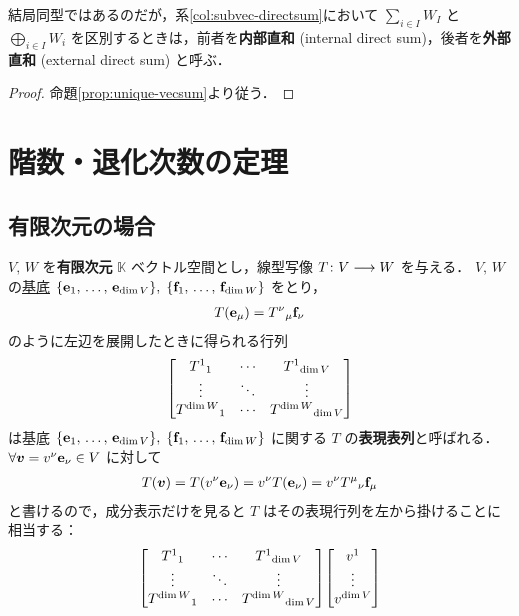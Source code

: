 \documentclass[rep_main]{subfiles}
\begin{document}
\begin{marker}
    結局同型ではあるのだが，系\ref{col:subvec-directsum}において $\sum_{i \in I} W_I$ と $\bigoplus_{i \in I} W_i$ を区別するときは，前者を\textbf{内部直和} (internal direct sum)，後者を\textbf{外部直和} (external direct sum) と呼ぶ．
\end{marker}

\begin{proof}
    命題\ref{prop:unique-vecsum}より従う．
\end{proof}

\section{階数・退化次数の定理}

\subsection{有限次元の場合}

$V,\, W$ を\textbf{有限次元} $\mathbb{K}$ ベクトル空間とし，線型写像 $T \colon V \longrightarrow W$ を与える．
$V,\, W$ の\hyperref[def:free-mod]{基底} $\{\vb{e}_1,\, \dots,\, \vb{e}_{\dim V}\},\; \{\vb{f}_1,\, \dots,\, \vb{f}_{\dim W}\}$ をとり，
\begin{align}
	T(\vb{e}_\mu) = T^\nu{}_{\mu} \vb{f}_\nu
\end{align}
のように左辺を展開したときに得られる行列
\begin{align}
	\mqty[T^1{}_1 & \cdots &T^1{}_{\dim V} \\ \vdots &\ddots &\vdots \\ T^{\dim W}{}_1 &\cdots &T^{\dim W}{}_{\dim V}]
\end{align}
は基底 $\{\vb{e}_1,\, \dots,\, \vb{e}_{\dim V}\},\; \{\vb{f}_1,\, \dots,\, \vb{f}_{\dim W}\}$ に関する $T$ の\textbf{表現表列}と呼ばれる．
$\forall \bm{v} = v^\nu \vb{e}_\nu \in V$ に対して
\begin{align}
	T(\bm{v}) = T(v^\nu \vb{e}_\nu) = v^\nu T(\vb{e}_\nu) = v^\nu T^\mu{}_{\nu} \vb{f}_\mu
\end{align}
と書けるので，成分表示だけを見ると $T$ はその表現行列を左から掛けることに相当する：
\begin{align}
	\mqty[T^1{}_1 & \cdots &T^1{}_{\dim V} \\ \vdots &\ddots &\vdots \\ T^{\dim W}{}_1 &\cdots &T^{\dim W}{}_{\dim V}] \mqty[v^1 \\ \vdots \\ v^{\dim V}]
\end{align}
\end{document}
